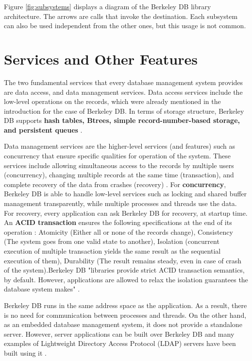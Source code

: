 \documentclass[9pt,twocolumn,twoside]{../../styles/osajnl}
\begin{document}
Figure \ref{fig:subsystems} displays a diagram of the Berkeley DB library architecture. 
The arrows are calls that invoke the destination. Each subsystem can also be used 
independent from the other ones, but this usage is not common.


\section{Services and Other Features}

The two fundamental services that every database management system provides are data access, 
and data management services. Data access services include the low-level operations on the 
records, which were already mentioned in the introduction for the case of Berkeley DB.
In terms of storage structure, Berkeley DB supports \textbf{hash tables, Btrees, simple 
record-number-based storage, and persistent queues} \cite{stanford-dbis}.

Data management services are the higher-level services (and features) such as concurrency that 
ensure specific qualities for operation of the system. These services include allowing simultaneous
access to the records by multiple users (concurrency), changing multiple records at the same 
time (transaction), and complete recovery of the data from crashes (recovery) \cite{stanford-dbis}. 
\newline
For \textbf{concurrency}, Berkeley DB is able to handle low-level services such as locking and 
shared buffer management transparently, while multiple processes and threads use the data.
\newline 
For recovery, every application can ask Berkeley DB for recovery, at startup time.
\newline
An \textbf{ACID transaction} ensures the following specifications at the end of its operation 
\cite{haerder1983principles}: Atomicity (Either all or none of the records change), Consistency 
(The system goes from one valid state to another), Isolation (concurrent execution of multiple 
transaction yields the same result as the sequential execution of them), Durability (The result 
remains steady, even in case of crash of the system).Berkeley DB "libraries provide strict ACID 
transaction semantics, by default. However, applications are allowed to relax the isolation 
guarantees the database system makes" \cite{stanford-dbis}.

Berkeley DB runs in the same address space as the application. As a result, there is no need 
for communication between processes and threads. On the other hand, as an embedded 
database management system, it does not provide a standalone server. However, server 
applications can be built over Berkeley DB and many examples of Lightweight Directory Access 
Protocol (LDAP) servers have been built using it \cite{stanford-dbisnot}.
\end{document}
